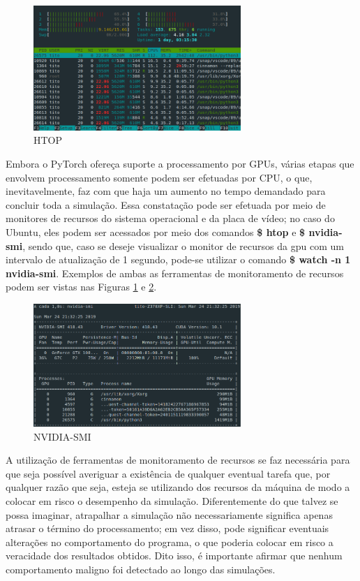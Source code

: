 \begin{figure}[H]
    \centering
    \includegraphics[width=0.70\textwidth]{figs/htop.png}
    \caption{HTOP}
    \label{fig:results_htop}
\end{figure}

Embora o PyTorch ofereça suporte a processamento por GPUs, várias etapas que envolvem processamento somente podem ser efetuadas por CPU, o que, inevitavelmente, faz com que haja um aumento no tempo demandado para concluir toda a simulação. Essa constatação pode ser efetuada por meio de monitores de recursos do sistema operacional e da placa de vídeo; no caso do Ubuntu, eles podem ser acessados por meio dos comandos \textbf{\$ htop} e \textbf{\$ nvidia-smi}, sendo que, caso se deseje visualizar o monitor de recursos da gpu com um intervalo de atualização de 1 segundo, pode-se utilizar o comando \textbf{\$ watch -n 1 nvidia-smi}. Exemplos de ambas as ferramentas de monitoramento de recursos podem ser vistas nas Figuras \ref{fig:results_htop} e \ref{fig:results_nvidia-smi}.


\begin{figure}[H]
    \centering
    \includegraphics[width=0.70\textwidth]{figs/nvidia-smi.png}
    \caption{NVIDIA-SMI}
    \label{fig:results_nvidia-smi}
\end{figure}


A utilização de ferramentas de monitoramento de recursos se faz necessária para que seja possível averiguar a existência de qualquer eventual tarefa que, por qualquer razão que seja, esteja se utilizando dos recursos da máquina de modo a colocar em risco o desempenho da simulação. Diferentemente do que talvez se possa imaginar, atrapalhar a simulação não necessariamente significa apenas atrasar o término do processamento; em vez disso, pode significar eventuais alterações no comportamento do programa, o que poderia colocar em risco a veracidade dos resultados obtidos. Dito isso, é importante afirmar que nenhum comportamento maligno foi detectado ao longo das simulações.




